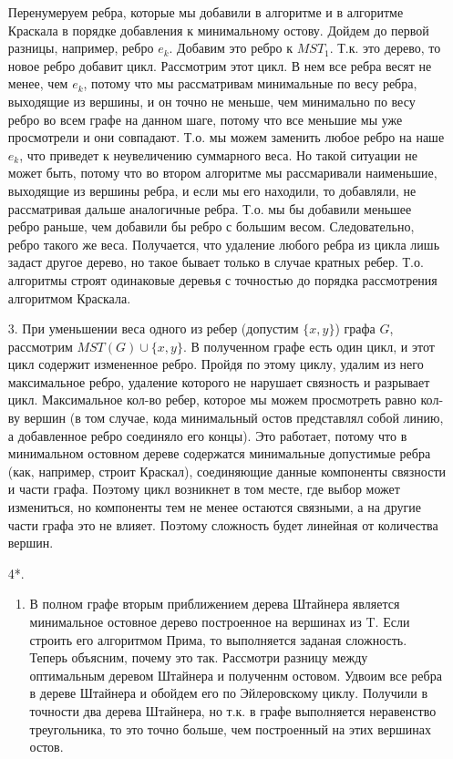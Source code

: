 \documentclass{article}
\begin{document}
\begin{enumerate}
Перенумеруем ребра, которые мы добавили в алгоритме и в алгоритме
Краскала в порядке добавления к минимальному остову. Дойдем до первой
разницы, например, ребро $e_{k}$.  Добавим это ребро к
$MST_{1}$. Т.к. это дерево, то новое ребро добавит цикл. Рассмотрим
этот цикл. В нем все ребра весят не менее, чем $e_k$, потому что мы
рассматривам минимальные по весу ребра, выходящие из вершины, и он
точно не меньше, чем минимально по весу ребро во всем графе на данном
шаге, потому что все меньшие мы уже просмотрели и они
совпадают. Т.о. мы можем заменить любое ребро на наше $e_k$, что
приведет к неувеличению суммарного веса. Но такой ситуации не может
быть, потому что во втором алгоритме мы рассмаривали наименьшие,
выходящие из вершины ребра, и если мы его находили, то добавляли, не
рассматривая дальше аналогичные ребра. Т.о. мы бы добавили меньшее
ребро раньше, чем добавили бы ребро с
большим весом. Следовательно, ребро такого же веса. Получается, что удаление
любого ребра из цикла лишь задаст другое дерево, но такое бывает только
в случае кратных ребер. Т.о. алгоритмы строят одинаковые деревья с
точностью до порядка рассмотрения алгоритмом Краскала.

\item[3.]
При уменьшении веса одного из ребер (допустим $\{x, y\}$) графа $G$, рассмотрим
$MST(G) \cup \{x, y\}$. В полученном графе есть один цикл, и этот цикл
содержит измененное ребро. Пройдя по этому циклу, удалим из него
максимальное ребро, удаление которого не нарушает связность и
разрывает цикл. Максимальное кол-во ребер, которое мы можем
просмотреть равно кол-ву вершин (в том случае, кода минимальный остов
представлял собой линию, а добавленное ребро соединяло его концы). Это
работает, потому что в минимальном остовном дереве содержатся
минимальные допустимые ребра (как, например, строит Краскал),
соединяющие данные компоненты связности и части графа. Поэтому цикл
возникнет в том месте, где выбор может измениться, но компоненты тем
не менее остаются связными, а на другие части графа это не влияет.
Поэтому сложность будет линейная от количества вершин.
\item[4*.]

\begin{enumerate}
\item

В полном графе вторым приближением дерева Штайнера является минимальное
остовное дерево построенное на вершинах из T. Если строить его
алгоритмом Прима, то выполняется заданая сложность. Теперь объясним,
почему это так. Рассмотри разницу между оптимальным деревом Штайнера и
полученнм остовом. Удвоим все ребра в дереве Штайнера и обойдем его по
Эйлеровскому циклу. Получили в точности два дерева Штайнера, но т.к. в
графе выполняется неравенство треугольника, то это точно больше, чем
построенный на этих вершинах остов.


\end{enumerate}
\end{enumerate}
\end{document}
